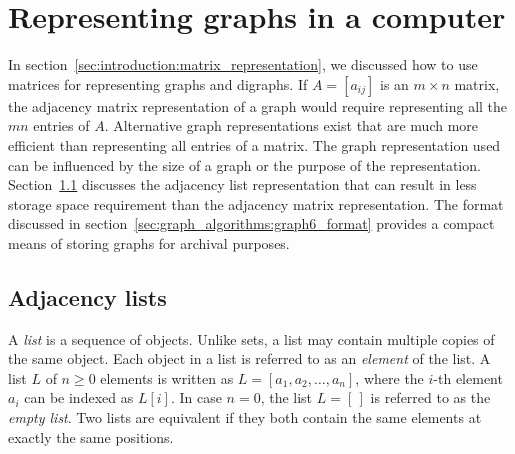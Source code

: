 
\section{Representing graphs in a computer}

In section~\ref{sec:introduction:matrix_representation}, we discussed
how to use matrices for representing graphs and digraphs. If
$A = [a_{ij}]$ is an $m \times n$ matrix, the adjacency matrix
representation of a graph would require representing all the $mn$
entries of $A$. Alternative graph representations exist that are much
more efficient than representing all entries of a matrix. The graph
representation used can be influenced by the size of a graph or the
purpose of the representation.
Section~\ref{sec:graph_algorithms:adjacency_lists} discusses the
adjacency list representation that can result in
less storage space requirement than the adjacency
matrix representation. The
\graphsix\index{\graphsix} format discussed in
section~\ref{sec:graph_algorithms:graph6_format} provides a compact
means of storing graphs for archival purposes.



\subsection{Adjacency lists}
\label{sec:graph_algorithms:adjacency_lists}

A \emph{list} is a sequence of objects. Unlike
sets, a list may contain multiple copies of the same
object. Each object in a list is referred to as an
\emph{element} of the list. A list $L$ of
$n \geq 0$ elements is written as $L = [a_1, a_2, \dots, a_n]$, where
the $i$-th element $a_i$ can be indexed as $L[i]$. In case $n = 0$,
the list $L = [\,]$ is referred to as the
\emph{empty list}. Two lists are equivalent if they
both contain the same elements at exactly the same positions.

